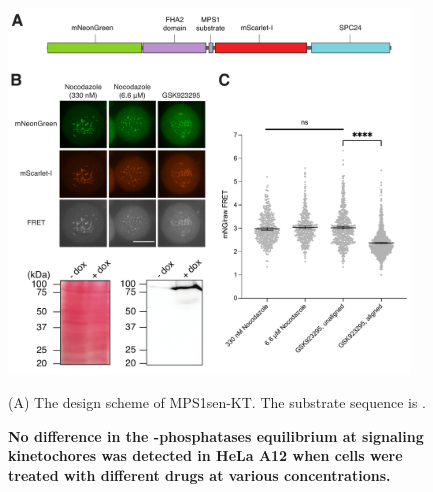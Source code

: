 \begin{figure}
    \centering
    \includegraphics[width=0.95\textwidth]{chapters/figures/MPS1sen-KT.pdf}
    \caption{\textbf{No difference in the -phosphatases equilibrium at signaling kinetochores was detected in HeLa A12 when cells were treated with different drugs at various concentrations.}}
    \noindent\justifying (A) The design scheme of MPS1sen-KT. The  substrate sequence is .

\end{figure}
